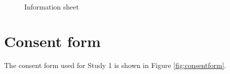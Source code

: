 \documentclass[11pt,oneside]{report}
\begin{document}
\begin{table}
\begin{figure}[htp] 
\caption{Information sheet}
\label{fig:informationsheet}
\end{figure} 

\chapter{Consent form}\label{ch:consentform}
The consent form used for Study 1 is shown in Figure \ref{fig:consentform}. 


\end{table}
\end{document}
